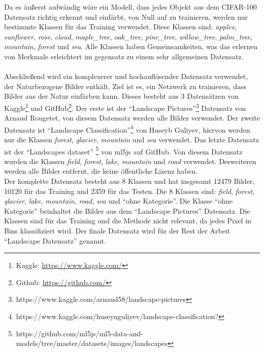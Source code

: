 Da es äußerst aufwändig wäre ein Modell, dass jedes Objekt aus dem CIFAR-100 Datensatz richtig erkennt und einfärbt, 
von Null auf zu trainieren, werden
nur bestimmte Klassen für das Training verwendet. Diese Klassen sind: \textit{apples}, \textit{sunflower}, \textit{rose}, \textit{cloud}, 
\textit{maple\_tree}, \textit{oak\_tree}, \textit{pine\_tree}, \textit{willow\_tree}, \textit{palm\_tree},
\textit{mountain}, \textit{forest} und \textit{sea}.
Alle Klassen haben Gemeinsamkeiten, was das erlernen von Merkmale erleichtert im gegensatz zu einem sehr allgemeinen Datensatz.
\\
\\
Abschließend wird ein komplexerer und hochauflösender Datensatz verwendet, der Naturbezogene Bilder enthält. Ziel ist es, ein Netzwerk zu
trainieren, dass Bilder aus der Natur einfärben kann. Dieses besteht aus 3 Datensätzen von 
Kaggle\footnote{Kaggle: \url{https://www.kaggle.com/}} und GitHub\footnote{Github: \url{https://github.com/}}. 
Der erste ist der ``Landscape Pictures''\footnote{https://www.kaggle.com/arnaud58/landscape-pictures} Datensatz von Arnaud Rougetet, von diesem
Datensatz werden alle Bilder verwendet. Der zweite Datensatz ist 
``Landscape Classification''\footnote{https://www.kaggle.com/huseynguliyev/landscape-classification?} von Huseyb Guliyev, hiervon werden nur
die Klassen \textit{forest}, \textit{glacier}, \textit{mountain} und \textit{sea} verwendet. Das letzte Datensatz ist der ``Landscapes dataset''
\footnote{https://github.com/ml5js/ml5-data-and-models/tree/master/datasets/images/landscapes} von ml5js auf GitHub. Von diesem Datensatz wurden
die Klassen \textit{field}, \textit{forest}, \textit{lake}, \textit{mountain} und \textit{road} verwendet. Desweiteren werden alle Bilder entfernt,
die keine öffentliche Lizenz haben.
\\
Der komplette Datensatz besteht aus 8 Klassen und hat insgesamt
12479 Bilder, 10120 für das Training und 2359 für das Testen. Die 8 Klassen sind: \textit{field}, \textit{forest}, \textit{glacier}, 
\textit{lake}, \textit{mountain}, \textit{road}, \textit{sea} und ``ohne Kategorie''.
Die Klasse ``ohne Kategorie'' beinhaltet die Bilder aus dem ``Landscape Pictures'' Datensatz. Die Klassen sind für das Training und 
die Methode nicht relevant, da jedes Pixel in Bins klassifiziert wird. Der finale Datensatz wird für der Rest der 
Arbeit ``Landscape Datensatz'' genannt.

